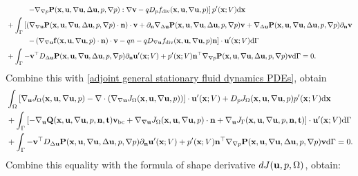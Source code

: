 \documentclass[oneside,11pt]{book}
\numberwithin{equation}{section}
\begin{document}
\begin{enumerate}[leftmargin=0in]
\begin{align*}
        &\hspace{1cm}\left.-\nabla_{\nabla p}{\bf P}({\bf x},{\bf u},\nabla{\bf u},\Delta{\bf u},p,\nabla p):\nabla{\bf v} - qD_pf_{\rm div}({\bf x},{\bf u},\nabla{\bf u},p)\right]p'({\bf x};V){\rm d}{\bf x}\\
        &+ \int_\Gamma \left[\left(\nabla_{\nabla{\bf u}}{\bf P}({\bf x},{\bf u},\nabla{\bf u},\Delta{\bf u},p,\nabla p)\cdot{\bf n}\right)\cdot{\bf v} + \partial_{\bf n}\nabla_{\Delta{\bf u}}{\bf P}({\bf x},{\bf u},\nabla{\bf u},\Delta{\bf u},p,\nabla p){\bf v} + \nabla_{\Delta{\bf u}}{\bf P}({\bf x},{\bf u},\nabla{\bf u},\Delta{\bf u},p,\nabla p)\partial_{\bf n}{\bf v}\right.\\
        &\hspace{1cm}\left.- \left(\nabla_{\nabla{\bf u}}{\bf f}({\bf x},{\bf u},\nabla{\bf u},p)\cdot{\bf n}\right)\cdot{\bf v} - qn - qD_{\nabla{\bf u}}f_{\rm div}({\bf x},{\bf u},\nabla{\bf u},p){\bf n}\right]\cdot{\bf u}'({\bf x};V){\rm d}\Gamma\\
        &+ \int_\Gamma -{\bf v}^\top D_{\Delta{\bf u}}{\bf P}({\bf x},{\bf u},\nabla{\bf u},\Delta{\bf u},p,\nabla p)\partial_{\bf n}{\bf u}'({\bf x};V) + p'({\bf x};V){\bf n}^\top\nabla_{\nabla p}{\bf P}({\bf x},{\bf u},\nabla{\bf u},\Delta{\bf u},p,\nabla p){\bf v}{\rm d}\Gamma = 0.
    \end{align*}
    Combine this with \eqref{adjoint general stationary fluid dynamics PDEs}, obtain
    \begin{align*}
        &\int_\Omega \left[\nabla_{\bf u}J_\Omega({\bf x},{\bf u},\nabla{\bf u},p) - \nabla\cdot\left(\nabla_{\nabla{\bf u}}J_\Omega({\bf x},{\bf u},\nabla{\bf u},p)\right)\right]\cdot{\bf u}'({\bf x};V) + D_pJ_\Omega({\bf x},{\bf u},\nabla{\bf u},p)p'({\bf x};V){\rm d}{\bf x}\\
        &+ \int_\Gamma \left[-\nabla_{\bf u}{\bf Q}({\bf x},{\bf u},\nabla{\bf u},p,{\bf n},{\bf t}){\bf v}_{\rm bc} + \nabla_{\nabla{\bf u}}J_\Omega({\bf x},{\bf u},\nabla{\bf u},p)\cdot{\bf n} + \nabla_{\bf u}J_\Gamma({\bf x},{\bf u},\nabla{\bf u},p,{\bf n},{\bf t})\right]\cdot{\bf u}'({\bf x};V){\rm d}\Gamma\\
        &+ \int_\Gamma -{\bf v}^\top D_{\Delta{\bf u}}{\bf P}({\bf x},{\bf u},\nabla{\bf u},\Delta{\bf u},p,\nabla p)\partial_{\bf n}{\bf u}'({\bf x};V) + p'({\bf x};V){\bf n}^\top\nabla_{\nabla p}{\bf P}({\bf x},{\bf u},\nabla{\bf u},\Delta{\bf u},p,\nabla p){\bf v}{\rm d}\Gamma = 0.
    \end{align*}
    Combine this equality with the formula of shape derivative $dJ({\bf u},p,\Omega)$, obtain:

\end{enumerate}
\end{document}
